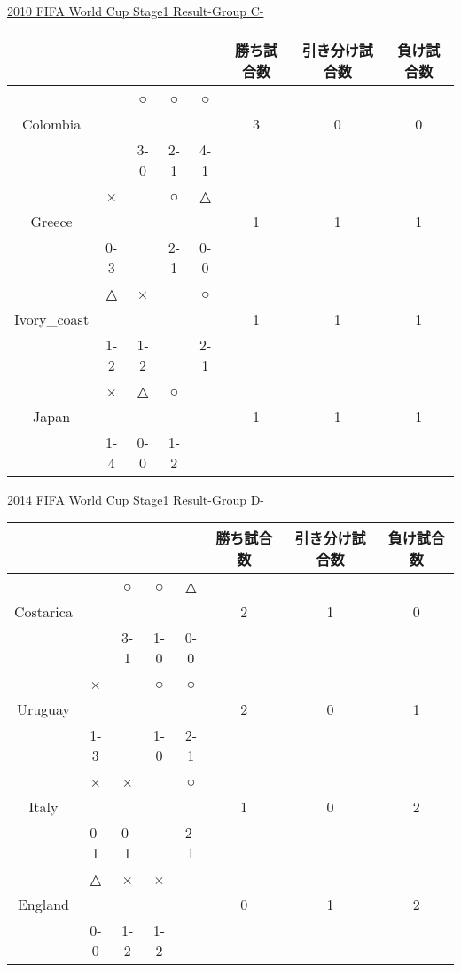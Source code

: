 \documentclass[a4j] {jarticle}
\begin{document}
		\newpage
		\begin{table}[htb]
		\begin{center}
		\underline{2010 FIFA World Cup Stage1 Result-Group C-}
		\begin{tabular}{|c|c|c|c|c|c|c|c|}
		\hline
		\multicolumn{1}{|c|}{} &
		\multicolumn{1}{c|}{} &
		\multicolumn{1}{c|}{} &
		\multicolumn{1}{c|}{} &
		\multicolumn{1}{c|}{} &
		\multicolumn{1}{c|}{勝ち試合数} &
		\multicolumn{1}{c|}{引き分け試合数} &
		\multicolumn{1}{c|}{負け試合数} \\
		\hline
 &  & ○ & ○ & ○ & & & \\ 
Colombia & & & & & 3 & 0 & 0 \\ 
 & & 3-0 & 2-1 & 4-1 &  & & \\ 
 \hline
 & × &  & ○ & △ & & & \\ 
Greece & & & & & 1 & 1 & 1 \\ 
 &0-3 &  & 2-1 & 0-0 &  & & \\ 
 \hline
 & △ & × &  & ○ & & & \\ 
Ivory\_coast & & & & & 1 & 1 & 1 \\ 
 &1-2 & 1-2 &  & 2-1 &  & & \\ 
 \hline
 & × & △ & ○ &  & & & \\ 
Japan & & & & & 1 & 1 & 1 \\ 
 &1-4 & 0-0 & 1-2 &  &  & & \\ 
 \hline
		\end{tabular}
		\end{center}
		\end{table}
		\newpage
		\begin{table}[htb]
		\begin{center}
		\underline{2014 FIFA World Cup Stage1 Result-Group D-}
		\begin{tabular}{|c|c|c|c|c|c|c|c|}
		\hline
		\multicolumn{1}{|c|}{} &
		\multicolumn{1}{c|}{} &
		\multicolumn{1}{c|}{} &
		\multicolumn{1}{c|}{} &
		\multicolumn{1}{c|}{} &
		\multicolumn{1}{c|}{勝ち試合数} &
		\multicolumn{1}{c|}{引き分け試合数} &
		\multicolumn{1}{c|}{負け試合数} \\
		\hline
 &  & ○ & ○ & △ & & & \\ 
Costarica & & & & & 2 & 1 & 0 \\ 
 & & 3-1 & 1-0 & 0-0 &  & & \\ 
 \hline
 & × &  & ○ & ○ & & & \\ 
Uruguay & & & & & 2 & 0 & 1 \\ 
 &1-3 &  & 1-0 & 2-1 &  & & \\ 
 \hline
 & × & × &  & ○ & & & \\ 
Italy & & & & & 1 & 0 & 2 \\ 
 &0-1 & 0-1 &  & 2-1 &  & & \\ 
 \hline
 & △ & × & × &  & & & \\ 
England & & & & & 0 & 1 & 2 \\ 
 &0-0 & 1-2 & 1-2 &  &  & & \\ 
 \hline
		\end{tabular}
		\end{center}
		\end{table}
\end{document}
